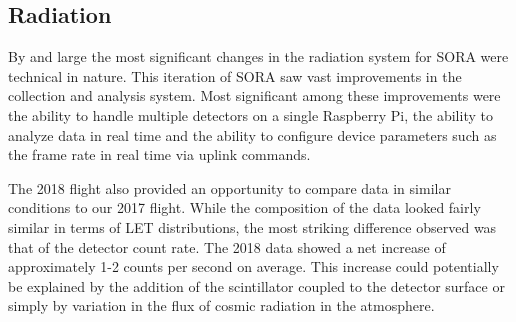 \subsection{Radiation}
\label{sec:Radiation Results Discussion}
By and large the most significant changes in the radiation system for SORA were technical in nature. This iteration of SORA saw vast improvements in the collection and analysis system. Most significant among these improvements were the ability to handle multiple detectors on a single Raspberry Pi, the ability to analyze data in real time and the ability to configure device parameters such as the frame rate in real time via uplink commands.

The 2018 flight also provided an opportunity to compare data in similar conditions to our 2017 flight. While the composition of the data looked fairly similar in terms of LET distributions, the most striking difference observed was that of the detector count rate. The 2018 data showed a net increase of approximately 1-2 counts per second on average. This increase could potentially be explained by the addition of the scintillator coupled to the detector surface or simply by variation in the flux of cosmic radiation in the atmosphere.
